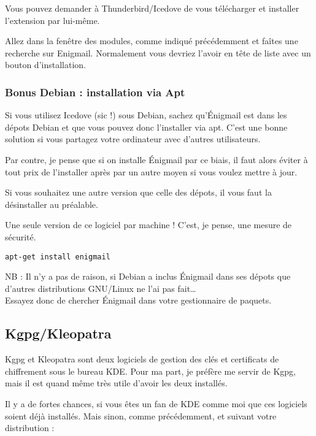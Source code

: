 Vous pouvez demander à Thunderbird/Icedove de vous télécharger et
installer l'extension par lui-même.

Allez dans la fenêtre des modules, comme indiqué précédemment et faîtes
une recherche sur Enigmail. Normalement vous devriez l'avoir en tête de
liste avec un bouton d'installation.

\subsubsection{Bonus Debian : installation via Apt}\label{bonus-debian-installation-via-apt}

Si vous utilisez Icedove (sic !) sous Debian, sachez qu'Énigmail est
dans les dépots Debian et que vous pouvez donc l'installer via apt.
C'est une bonne solution si vous partagez votre ordinateur avec d'autres
utilisateurs.

Par contre, je pense que si on installe Énigmail par ce biais, il faut
alors éviter à tout prix de l'installer après par un autre moyen si vous
voulez mettre à jour.

Si vous souhaitez une autre version que celle des dépots, il vous faut
la désinstaller au préalable.

\begin{warning}
Une seule version de ce logiciel par machine ! C'est, je
pense, une mesure de sécurité.
\end{warning}

\begin{lstlisting}
apt-get install enigmail
\end{lstlisting}

\begin{notice}NB : Il n'y a pas de raison, si Debian a inclus Énigmail dans ses
dépots que d'autres distributions GNU/Linux ne l'ai pas
fait\ldots{}\\Essayez donc de chercher Énigmail dans votre gestionnaire
de paquets.
\end{notice}

\subsection{Kgpg/Kleopatra}\label{kgpgkleopatra}

Kgpg et Kleopatra sont deux logiciels de gestion des clés et certificats
de chiffrement sous le bureau KDE. Pour ma part, je préfère me servir de
Kgpg, mais il est quand même très utile d'avoir les deux installés.

Il y a de fortes chances, si vous êtes un fan de KDE comme moi que ces
logiciels soient déjà installés. Mais sinon, comme précédemment, et
suivant votre distribution :

